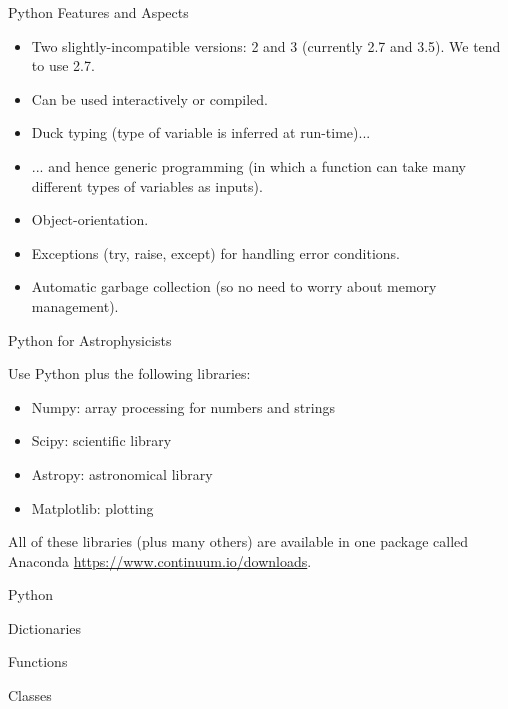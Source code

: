 \documentclass{beamer}
\begin{document}
\begin{frame}{Python Features and Aspects}
  \begin{itemize}
    \item Two slightly-incompatible versions: 2 and 3 (currently 2.7 and 3.5). We tend to use 2.7.
    \item Can be used interactively or compiled.
    \item Duck typing (type of variable is inferred at run-time)...
    \item ... and hence generic programming (in which a function can take many different types of variables as inputs).
    \item Object-orientation.
    \item Exceptions (try, raise, except) for handling error conditions.
    \item Automatic garbage collection (so no need to worry about memory management).
  \end{itemize}
\end{frame}


\begin{frame}{Python for Astrophysicists}
  \begin{block}{Use Python plus the following libraries:}
    \begin{itemize}
      \item Numpy: array processing for numbers and strings
      \item Scipy: scientific library
      \item Astropy: astronomical library
      \item Matplotlib: plotting
    \end{itemize}
  \end{block}
  \begin{block}{All of these libraries (plus many others) are available in one package called Anaconda \url{https://www.continuum.io/downloads}.}
  \end{block}
\end{frame}

\begin{frame}{Python}
  \begin{block}{Dictionaries}
  
  \end{block}
  \begin{block}{Functions}

  \end{block}
  \begin{block}{Classes}

  \end{block}
\end{frame}
\end{document}
